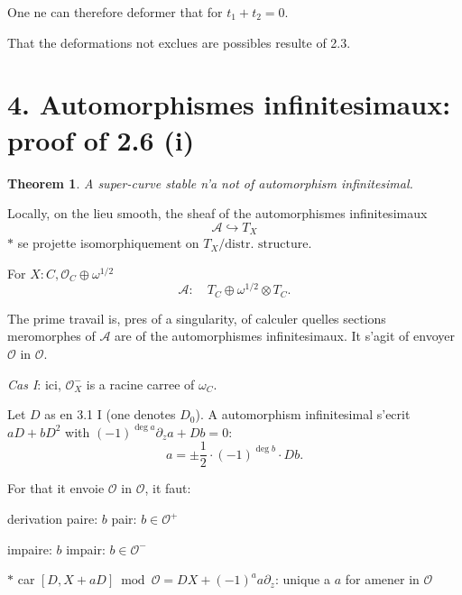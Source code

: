 \documentclass[11pt,a4paper]{article}
\theoremstyle{plain}
\newtheorem{theorem}{Theorem}
\theoremstyle{definition}
\begin{document}
One ne can therefore deformer that for $t_1 + t_2 = 0$.

That the deformations not exclues are possibles resulte of 2.3.

\newpage

\section*{4. Automorphismes infinitesimaux: proof of 2.6 (i)}

\begin{theorem}
A super-curve stable n'a not of automorphism infinitesimal.
\end{theorem}

Locally, on the lieu smooth, the sheaf of the automorphismes infinitesimaux
\[
\mathcal{A} \hookrightarrow T_X
\]
$*$ se projette isomorphiquement on $T_X / \text{distr. structure}$.

For $X : C, \mathcal{O}_C \oplus \omega^{1/2}$
\[
\mathcal{A} : \quad T_C \oplus \omega^{1/2} \otimes T_C.
\]

The prime travail is, pres of a singularity, of calculer quelles sections meromorphes of $\mathcal{A}$ are of the automorphismes infinitesimaux. It s'agit of envoyer $\mathcal{O}$ in $\mathcal{O}$.

\medskip

\noindent \textit{Cas I}: ici, $\mathcal{O}_X^-$ is a racine carree of $\omega_C$.

Let $D$ as en 3.1 I (one denotes $D_0$). A automorphism infinitesimal s'ecrit $aD + bD^2$ with $(-1)^{\deg a} \partial_z a + Db = 0$:
\[
a = \pm \frac{1}{2} \cdot (-1)^{\deg b} \cdot Db.
\]

For that it envoie $\mathcal{O}$ in $\mathcal{O}$, it faut:

\hspace{1cm} derivation paire: $b$ pair: $b \in \mathcal{O}^+$

\hspace{1cm} impaire: $b$ impair: $b \in \mathcal{O}^-$

\begin{center}
\end{center}

\vspace{0.5cm}

$*$ car $[D, X + aD] \bmod \mathcal{O} = DX + (-1)^a a\partial_z$: unique a $a$ for amener in $\mathcal{O}$
\end{document}
